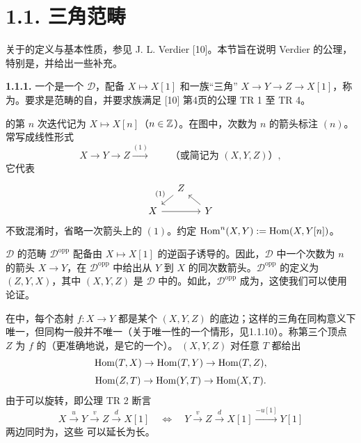 \section*{1.1. 三角范畴}
关于的定义与基本性质，参见 J. L. Verdier [10]。本节旨在说明 Verdier 的公理，特别是，并给出一些补充。

\par\medskip\noindent\textbf{1.1.1.} 一个是一个 $\mathcal D$，配备 $X\mapsto X[1]$ 和一族“三角” $X\to Y\to Z\to X[1]$，称为。要求是范畴的自，并要求族满足 [10] 第4页的公理 TR 1 至 TR 4。

的第 $n$ 次迭代记为 $X\mapsto X[n]$（$n\in\mathbb Z$）。在图中，次数为 $n$ 的箭头标注 $(n)$。常写成线性形式
\[
 X\longrightarrow Y\longrightarrow Z\xrightarrow{(1)}
 \qquad\text{（或简记为 $(X,Y,Z)$）},
\]
它代表
\[
\begin{tikzcd}[ampersand replacement=\&,column sep=small,row sep=small]
 \& Z\arrow[dl,"{(1)}"']\&\\
 X\arrow[rr]\&\&Y\arrow[ul]
\end{tikzcd}
\]
不致混淆时，省略一次箭头上的 $(1)$。约定 $\operatorname{Hom}^n(X,Y):=\operatorname{Hom}(X,Y[n])$。

$\mathcal D$ 的范畴 $\mathcal D^{\mathrm{opp}}$ 配备由 $X\mapsto X[1]$ 的逆函子诱导的。因此，$\mathcal D$ 中一个次数为 $n$ 的箭头 $X\to Y$，在 $\mathcal D^{\mathrm{opp}}$ 中给出从 $Y$ 到 $X$ 的同次数箭头。$\mathcal D^{\mathrm{opp}}$ 的定义为 $(Z,Y,X)$，其中 $(X,Y,Z)$ 是 $\mathcal D$ 中的。如此，$\mathcal D^{\mathrm{opp}}$ 成为，这使我们可以使用论证。

在中，每个态射 $f:X\to Y$ 都是某个 $(X,Y,Z)$ 的底边；这样的三角在同构意义下唯一，但同构一般并不唯一（关于唯一性的一个情形，见1.1.10）。称第三个顶点 $Z$ 为 $f$ 的（更准确地说，是它的一个）。 $(X,Y,Z)$ 对任意 $T$ 都给出
\[
 \begin{gathered}
 \operatorname{Hom}(T,X)\to\operatorname{Hom}(T,Y)\to\operatorname{Hom}(T,Z),\\[3pt]
 \operatorname{Hom}(Z,T)\to\operatorname{Hom}(Y,T)\to\operatorname{Hom}(X,T).
 \end{gathered}
\]
由于可以旋转，即公理 TR 2 断言
\[
 X\xrightarrow{u}Y\xrightarrow{v}Z\xrightarrow{d}X[1]
 \quad\Longleftrightarrow\quad
 Y\xrightarrow{v}Z\xrightarrow{d}X[1]\xrightarrow{-u[1]}Y[1]
\]
两边同时为，这些
可以延长为长。

